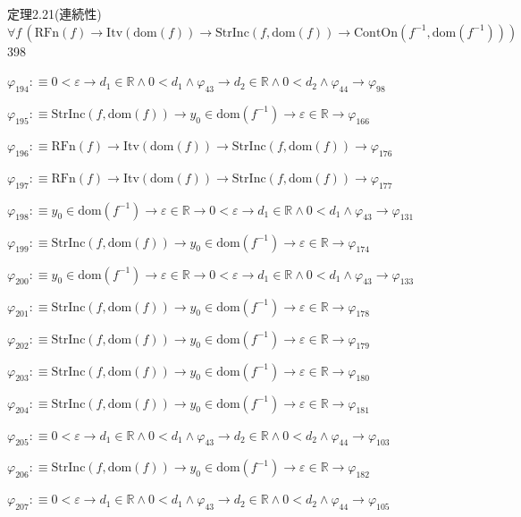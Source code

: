 \begin{fullproof}{定理2.21(連続性)}{$\forall f\,(\mathrm{RFn}(f) \to \mathrm{Itv}(\mathrm{dom}(f)) \to \mathrm{StrInc}(f,\mathrm{dom}(f)) \to \mathrm{ContOn}(f^{-1},\mathrm{dom}(f^{-1})))$}{398}
\begin{abbrevlist}
\item $\varphi_{194} :\equiv 0 < \varepsilon \to d_{1} \in \mathbb{R} \land 0 < d_{1} \land \varphi_{43} \to d_{2} \in \mathbb{R} \land 0 < d_{2} \land \varphi_{44} \to \varphi_{98}$
\item $\varphi_{195} :\equiv \mathrm{StrInc}(f,\mathrm{dom}(f)) \to y_{0} \in \mathrm{dom}(f^{-1}) \to \varepsilon \in \mathbb{R} \to \varphi_{166}$
\item $\varphi_{196} :\equiv \mathrm{RFn}(f) \to \mathrm{Itv}(\mathrm{dom}(f)) \to \mathrm{StrInc}(f,\mathrm{dom}(f)) \to \varphi_{176}$
\item $\varphi_{197} :\equiv \mathrm{RFn}(f) \to \mathrm{Itv}(\mathrm{dom}(f)) \to \mathrm{StrInc}(f,\mathrm{dom}(f)) \to \varphi_{177}$
\item $\varphi_{198} :\equiv y_{0} \in \mathrm{dom}(f^{-1}) \to \varepsilon \in \mathbb{R} \to 0 < \varepsilon \to d_{1} \in \mathbb{R} \land 0 < d_{1} \land \varphi_{43} \to \varphi_{131}$
\item $\varphi_{199} :\equiv \mathrm{StrInc}(f,\mathrm{dom}(f)) \to y_{0} \in \mathrm{dom}(f^{-1}) \to \varepsilon \in \mathbb{R} \to \varphi_{174}$
\item $\varphi_{200} :\equiv y_{0} \in \mathrm{dom}(f^{-1}) \to \varepsilon \in \mathbb{R} \to 0 < \varepsilon \to d_{1} \in \mathbb{R} \land 0 < d_{1} \land \varphi_{43} \to \varphi_{133}$
\item $\varphi_{201} :\equiv \mathrm{StrInc}(f,\mathrm{dom}(f)) \to y_{0} \in \mathrm{dom}(f^{-1}) \to \varepsilon \in \mathbb{R} \to \varphi_{178}$
\item $\varphi_{202} :\equiv \mathrm{StrInc}(f,\mathrm{dom}(f)) \to y_{0} \in \mathrm{dom}(f^{-1}) \to \varepsilon \in \mathbb{R} \to \varphi_{179}$
\item $\varphi_{203} :\equiv \mathrm{StrInc}(f,\mathrm{dom}(f)) \to y_{0} \in \mathrm{dom}(f^{-1}) \to \varepsilon \in \mathbb{R} \to \varphi_{180}$
\item $\varphi_{204} :\equiv \mathrm{StrInc}(f,\mathrm{dom}(f)) \to y_{0} \in \mathrm{dom}(f^{-1}) \to \varepsilon \in \mathbb{R} \to \varphi_{181}$
\item $\varphi_{205} :\equiv 0 < \varepsilon \to d_{1} \in \mathbb{R} \land 0 < d_{1} \land \varphi_{43} \to d_{2} \in \mathbb{R} \land 0 < d_{2} \land \varphi_{44} \to \varphi_{103}$
\item $\varphi_{206} :\equiv \mathrm{StrInc}(f,\mathrm{dom}(f)) \to y_{0} \in \mathrm{dom}(f^{-1}) \to \varepsilon \in \mathbb{R} \to \varphi_{182}$
\item $\varphi_{207} :\equiv 0 < \varepsilon \to d_{1} \in \mathbb{R} \land 0 < d_{1} \land \varphi_{43} \to d_{2} \in \mathbb{R} \land 0 < d_{2} \land \varphi_{44} \to \varphi_{105}$

\end{abbrevlist}
\end{fullproof}
